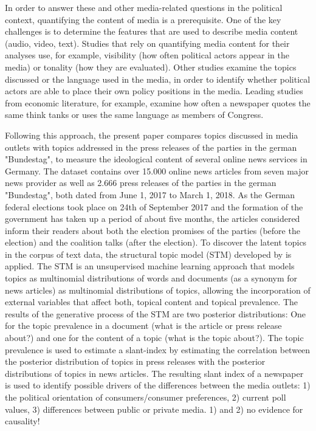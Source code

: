 \documentclass[12pt,a4paper,notitlepage]{article}
\begin{document}
In order to answer these and other media-related questions in the political context, quantifying the content of media is a prerequisite. One of the key challenges is to determine the features that are used to describe media content (audio, video, text). Studies that rely on quantifying media content for their analyses use, for example, visibility (how often political actors appear in the media) or tonality (how they are evaluated). Other studies examine the topics discussed or the language used in the media, in order to identify whether political actors are able to place their own policy positions in the media. Leading studies from economic literature, for example, examine how often a newspaper quotes the same think tanks \citep{groseclose_measure_2005, lott_is_2014} or uses the same language \citep{gentzkow_media_2004} as members of Congress. 

Following this approach, the present paper compares topics discussed in media outlets with topics addressed in the press releases of the parties in the german "Bundestag", to measure the ideological content of several online news services in Germany. The dataset contains over 15.000 online news articles from seven major news provider as well as 2.666 press releases of the parties in the german "Bundestag", both dated from June 1, 2017 to March 1, 2018. As the German federal elections took place on 24th of September 2017 and the formation of the government has taken up a period of about five months, the articles considered inform their readers about both the election promises of the parties (before the election) and the coalition talks (after the election). To discover the latent topics in the corpus of text data, the structural topic model (STM) developed by \citet{roberts_model_2016} is applied. The STM is an unsupervised machine learning approach that models topics as multinomial distributions of words and documents (as a synonym for news articles) as multinomial distributions of topics, allowing the incorporation of external variables that affect both, topical content and topical prevalence. The results of the generative process of the STM are two posterior distributions: One for the topic prevalence in a document (what is the article or press release about?) and one for the content of a topic (what is the topic about?). The topic prevalence is used to estimate a slant-index by estimating the correlation between the posterior distribution of topics in press releases with the posterior distributions of topics in news articles. The resulting slant index of a newspaper is used to identify possible drivers of the differences between the media outlets: 1) the political orientation of consumers/consumer preferences, 2) current poll values, 3) differences between public or private media. 1) and 2) no evidence for causality! 
\end{document}
